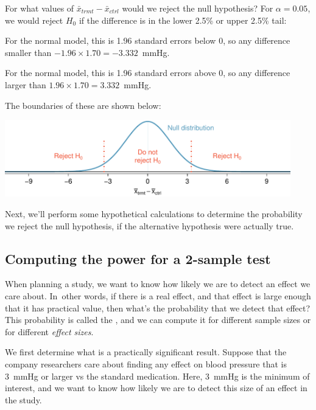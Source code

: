 \begin{example}{For what values of $\bar{x}_{trmt} - \bar{x}_{ctrl}$ would we reject the null hypothesis?}
For $\alpha = 0.05$, we would reject $H_0$ if the difference is in the lower 2.5\% or upper 2.5\% tail:
\begin{description}
\setlength{\itemsep}{0mm}
\item[Lower 2.5\%:] For the normal model, this is 1.96 standard errors below 0, so any difference smaller than $-1.96 \times 1.70 = -3.332$~mmHg.
\item[Upper 2.5\%:] For the normal model, this is 1.96 standard errors above 0, so any difference larger than $1.96 \times 1.70 = 3.332$~mmHg.
\end{description}
The boundaries of these  are shown below:
\begin{center}
\includegraphics[width=0.93\textwidth]{ch_inference_for_means/figures/power_null_0_1-7/power_null_B_0_1-7_with_rejection_region}
\end{center}
\end{example}

Next, we'll perform some hypothetical calculations to determine the probability we reject the null hypothesis, if the alternative hypothesis were actually true.


\subsection{Computing the power for a 2-sample test}

When planning a study, we want to know how likely we are to detect an effect we care about. In~other words, if there is a real effect, and that effect is large enough that it has practical value, then what's the probability that we detect that effect? This probability is called the , and we can compute it for different sample sizes or for different \emph{effect sizes}.

We first determine what is a practically significant result. Suppose that the company researchers care about finding any effect on blood pressure that is 3~mmHg or larger vs the standard medication. Here, 3~mmHg is the minimum  of interest, and we want to know how likely we are to detect this size of an effect in the study.

